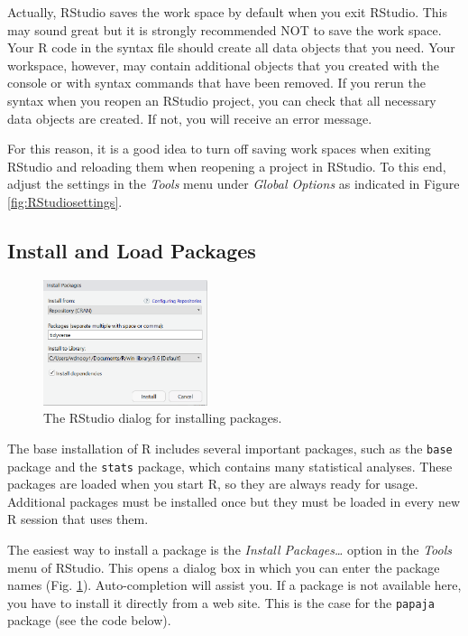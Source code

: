 \documentclass[doc,floatsintext]{apa6}
\begin{document}
Actually, RStudio saves the work space by default when you exit RStudio.
This may sound great but it is strongly recommended NOT to save the work
space. Your R code in the syntax file should create all data objects
that you need. Your workspace, however, may contain additional objects
that you created with the console or with syntax commands that have been
removed. If you rerun the syntax when you reopen an RStudio project, you
can check that all necessary data objects are created. If not, you will
receive an error message.

For this reason, it is a good idea to turn off saving work spaces when
exiting RStudio and reloading them when reopening a project in RStudio.
To this end, adjust the settings in the \emph{Tools} menu under
\emph{Global Options} as indicated in Figure \ref{fig:RStudiosettings}.

\subsection{Install and Load Packages}\label{packages}

\begin{figure}
\includegraphics[width=1.9in]{installpackage} \caption{The RStudio dialog for installing packages.}\label{fig:installscreen}
\end{figure}

The base installation of R includes several important packages, such as
the \texttt{base} package and the \texttt{stats} package, which contains
many statistical analyses. These packages are loaded when you start R,
so they are always ready for usage. Additional packages must be
installed once but they must be loaded in every new R session that uses
them.

The easiest way to install a package is the \emph{Install
Packages\ldots{}} option in the \emph{Tools} menu of RStudio. This opens
a dialog box in which you can enter the package names (Fig.
\ref{fig:installscreen}). Auto-completion will assist you. If a package
is not available here, you have to install it directly from a web site.
This is the case for the \texttt{papaja} package (see the code below).
\end{document}
